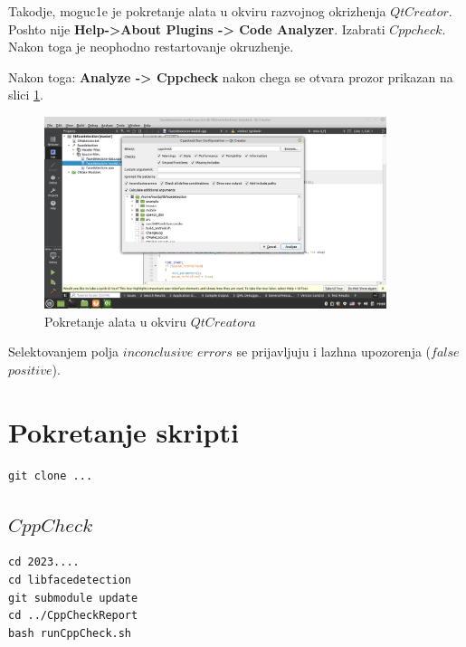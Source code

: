 \documentclass{article}
\begin{document}
\selectfont
Takodje, moguc1e je pokretanje alata u okviru razvojnog okrizhenja $QtCreator.$ Poshto nije 
\selectfont
\textbf{Help->About Plugins -> Code Analyzer}.
\selectfont
Izabrati $Cppcheck$. Nakon toga 
je neophodno restartovanje okruzhenje.

Nakon toga: 
\selectfont
\textbf{Analyze -> Cppcheck}
\selectfont
nakon chega se otvara prozor prikazan na slici \ref{qt:cppcheck}.

\begin{figure}[H]
    \centering
    \includegraphics[width=10cm]{img/CppCheckQt.png}
    \caption{Pokretanje alata u okviru $QtCreatora$}
    \label{qt:cppcheck}
\end{figure}

Selektovanjem polja $inconclusive$ $errors$ se prijavljuju i lazhna upozorenja ($false$ $positive$). 

\section{Pokretanje skripti}
\selectfont

\begin{verbatim}
git clone ...
\end{verbatim}

\subsection*{$CppCheck$}
\begin{verbatim}
cd 2023....
cd libfacedetection
git submodule update
cd ../CppCheckReport
bash runCppCheck.sh
\end{verbatim}
\selectfont


\selectfont

\end{document}
